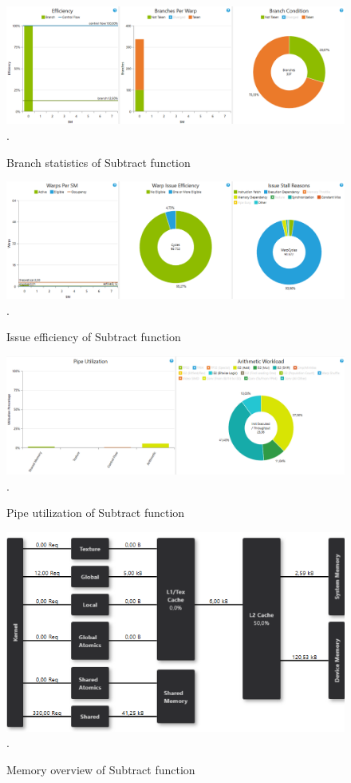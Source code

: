 \documentclass[oneside,openright,12pt,final,en]{mgr}
\begin{document}
\begin{figure}[H]
	\centering
	\includegraphics[width=\textwidth]{subtract_branch}.
	\caption{Branch statistics of Subtract function}
	\label{fig:subtract_branch}
\end{figure}

\begin{figure}[H]
	\centering
	\includegraphics[width=\textwidth]{subtract_issue}.
	\caption{Issue efficiency of Subtract function}
	\label{fig:subtract_issue}
\end{figure}

\begin{figure}[H]
	\centering
	\includegraphics[width=\textwidth]{subtract_pipe}.
	\caption{Pipe utilization of Subtract function}
	\label{fig:subtract_pipe}
\end{figure}

\begin{figure}[H]
	\centering
	\includegraphics[width=\textwidth]{subtract_memory}.
	\caption{Memory overview of Subtract function}
	\label{fig:subtract_memory}
\end{figure}
\end{document}
